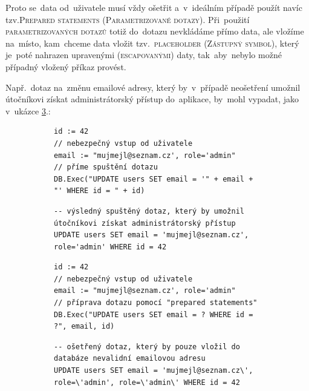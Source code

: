 \documentclass[14pt,a4paper]{article}
\begin{document}
            Proto se~data od~uživatele musí vždy ošetřit a~v~ideálním případě použít navíc tzv.\textsc{Prepared statements} (\textsc{Parametrizované dotazy}).
            Při~použití \textsc{parametrizovaných dotazů} totiž do~dotazu nevkládáme přímo data, ale vložíme na~místo, kam~chceme data vložit tzv.~\textsc{placeholder} (\textsc{Zástupný symbol}), který je~poté nahrazen upravenými (\textsc{escapovanými}) daty, tak~aby~nebylo možné případný vložený příkaz provést.
            
            Např.~dotaz na~změnu emailové adresy, který by~v~případě neošetření umožnil útočníkovi získat administrátorský přístup do~aplikace, by~mohl vypadat, jako v~ukázce \ref{model-sql-injection}.:
            \begin{figure}
                \begin{subfigure}{0.48\textwidth}
                    \centering
                    \begin{verbatim}
id := 42
// nebezpečný vstup od uživatele
email := "mujmejl@seznam.cz', role='admin"
// příme spuštění dotazu
DB.Exec("UPDATE users SET email = '" + email + "' WHERE id = " + id)
                    \end{verbatim}
                    \begin{verbatim}
-- výsledný spuštěný dotaz, který by umožnil útočníkovi získat administrátorský přístup
UPDATE users SET email = 'mujmejl@seznam.cz', role='admin' WHERE id = 42
                    \end{verbatim}
                    \label{model-sql-injection}
                \end{subfigure}
                \begin{subfigure}{0.48\textwidth}
                    \centering
                    \begin{verbatim}
id := 42
// nebezpečný vstup od uživatele
email := "mujmejl@seznam.cz', role='admin"
// příprava dotazu pomocí "prepared statements"
DB.Exec("UPDATE users SET email = ? WHERE id = ?", email, id)
                    \end{verbatim}
                    \begin{verbatim}
-- ošetřený dotaz, který by pouze vložil do databáze nevalidní emailovou adresu
UPDATE users SET email = 'mujmejl@seznam.cz\', role=\'admin', role=\'admin\' WHERE id = 42
                    \end{verbatim}
                    \label{model-sql-injection}
                \end{subfigure}
            \end{figure}
\end{document}
